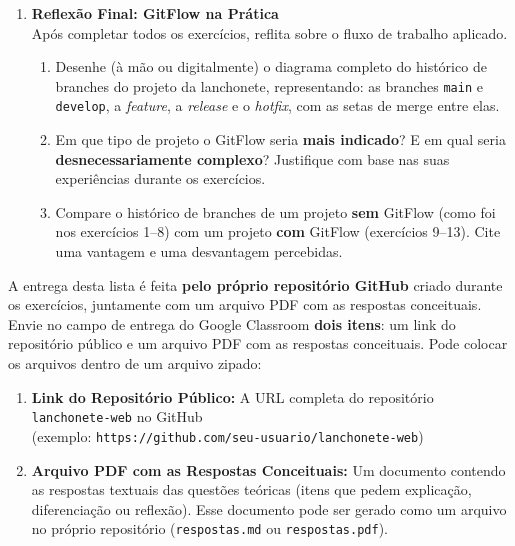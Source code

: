 \documentclass[12pt]{article}
\begin{document}
\begin{enumerate}[label=\textbf{Questão \arabic*:}, leftmargin=1.5cm, labelsep=0.5cm, resume]
    \item \textbf{Reflexão Final: GitFlow na Prática} \\
    Após completar todos os exercícios, reflita sobre o fluxo de trabalho aplicado.
    \begin{enumerate}[label=\alph*)]
        \item Desenhe (à mão ou digitalmente) o diagrama completo do histórico de branches do projeto da lanchonete, representando: as branches \texttt{main} e \texttt{develop}, a \textit{feature}, a \textit{release} e o \textit{hotfix}, com as setas de merge entre elas.
        \item Em que tipo de projeto o GitFlow seria \textbf{mais indicado}? E em qual seria \textbf{desnecessariamente complexo}? Justifique com base nas suas experiências durante os exercícios.
        \item Compare o histórico de branches de um projeto \textbf{sem} GitFlow (como foi nos exercícios 1--8) com um projeto \textbf{com} GitFlow (exercícios 9--13). Cite uma vantagem e uma desvantagem percebidas.
    \end{enumerate}

\end{enumerate}

\vspace{1cm}

\begin{tcolorbox}[
  colback=meuverde!5,
  colframe=meuverde,
  arc=4pt,
  title={\textbf{Instruções de Entrega}},
  fonttitle=\bfseries\color{white}
]
A entrega desta lista é feita \textbf{pelo próprio repositório GitHub} criado durante os exercícios, juntamente com um arquivo PDF com as respostas conceituais.
Envie no campo de entrega do Google Classroom \textbf{dois itens}: um link do repositório público e um arquivo PDF com as respostas conceituais. Pode colocar os arquivos dentro de um arquivo zipado:

\vspace{0.3cm}
\begin{enumerate}[label=\textbf{\arabic*.}, leftmargin=1.5cm]
    \item \textbf{Link do Repositório Público:} A URL completa do repositório \texttt{lanchonete-web} no GitHub\\
    (exemplo: \texttt{https://github.com/seu-usuario/lanchonete-web})

    \item \textbf{Arquivo PDF com as Respostas Conceituais:} Um documento contendo as respostas textuais das questões teóricas (itens que pedem explicação, diferenciação ou reflexão). Esse documento pode ser gerado como um arquivo no próprio repositório (\texttt{respostas.md} ou \texttt{respostas.pdf}).
\end{enumerate}
\end{tcolorbox}
\end{document}
